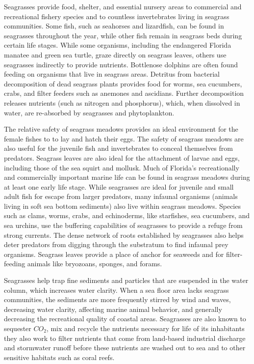 \documentclass[12pt]{report}   %
\begin{document}
Seagrasses provide food, shelter, and essential nursery areas to commercial and recreational fishery species and to countless invertebrates living in seagrass communities.
Some fish, such as seahorses and lizardfish, can be found in seagrasses throughout the year, while other fish remain in seagrass beds during certain life stages. While some organisms, including the endangered Florida manatee and green sea turtle, graze directly on seagrass leaves, others use seagrasses indirectly to provide nutrients. Bottlenose dolphins are often found feeding on organisms that live in seagrass areas. Detritus from bacterial decomposition of dead seagrass plants provides food for worms, sea cucumbers, crabs, and filter feeders such as anemones and ascidians. Further decomposition releases nutrients (such as nitrogen and phosphorus), which, when dissolved in water, are re-absorbed by seagrasses and phytoplankton.

The relative safety of seagrass meadows provides an ideal environment for the female fishes to to lay and hatch their eggs. The safety of seagrass meadows are also useful for the juvenile fish and invertebrates to conceal themselves from predators. Seagrass leaves are also ideal for the attachment of larvae and eggs, including those of the sea squirt and mollusk. Much of Florida's recreationally and commercially important marine life can be found in seagrass meadows during at least one early life stage. While seagrasses are ideal for juvenile and small adult fish for escape from larger predators, many infaunal organisms (animals living in soft sea bottom sediments) also live within seagrass meadows. Species such as clams, worms, crabs, and echinoderms, like starfishes, sea cucumbers, and sea urchins, use the buffering capabilities of seagrasses to provide a refuge from strong currents. The dense network of roots established by seagrasses also helps deter predators from digging through the substratum to find 
infaunal prey organisms. Seagrass leaves provide a place of anchor for seaweeds and for filter-feeding animals like bryozoans, sponges, and forams.

Seagrasses help trap fine sediments and particles that are suspended in the water column, which increases water clarity. When a sea floor area lacks seagrass communities, the sediments are more frequently stirred by wind and waves, decreasing water clarity, affecting marine animal behavior, and generally decreasing the recreational quality of coastal areas. Seagrasses are also known to sequester $C O_2$, mix and recycle the nutrients necessary for life of its inhabitants they also work to filter nutrients that come from land-based industrial discharge and stormwater runoff before these nutrients are washed out to sea and to other sensitive habitats such as coral reefs.
\end{document}
